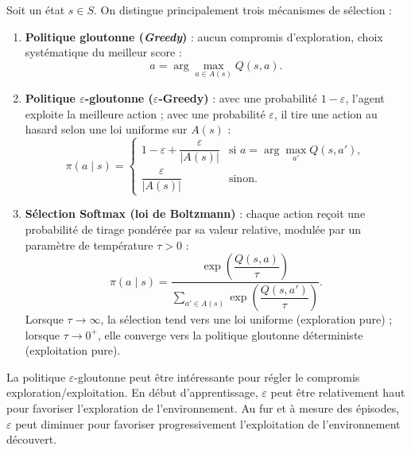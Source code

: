\begin{definition}
    Soit un état $s \in S$. On distingue principalement trois mécanismes de sélection :
    \begin{enumerate}
        \item \textbf{Politique gloutonne (\emph{Greedy})} : aucun compromis d'exploration, choix systématique du meilleur score :
        \begin{equation}
            a = \arg\max_{a \in A(s)} Q(s, a).
        \end{equation}
        \item \textbf{Politique $\varepsilon$-gloutonne ($\varepsilon$-Greedy)} : avec une probabilité $1 - \varepsilon$, l'agent exploite la meilleure action ; avec une probabilité $\varepsilon$, il tire une action au hasard selon une loi uniforme sur $A(s)$ :
        \begin{equation}
            \pi(a \mid s) = 
            \begin{cases}
                1 - \varepsilon + \dfrac{\varepsilon}{|A(s)|} & \text{si } a = \arg\max_{a'} Q(s, a'), \\[8pt]
                \dfrac{\varepsilon}{|A(s)|} & \text{sinon.}
            \end{cases}
        \end{equation}
        \item \textbf{Sélection Softmax (loi de Boltzmann)} : chaque action reçoit une probabilité de tirage pondérée par sa valeur relative, modulée par un paramètre de température $\tau > 0$ :
        \begin{equation}
            \pi(a \mid s) = \frac{\exp\left( \dfrac{Q(s, a)}{\tau} \right)}{\sum_{a' \in A(s)} \exp\left( \dfrac{Q(s, a')}{\tau} \right)}.
        \end{equation}
        Lorsque $\tau \to \infty$, la sélection tend vers une loi uniforme (exploration pure) ; lorsque $\tau \to 0^+$, elle converge vers la politique gloutonne déterministe (exploitation pure).
    \end{enumerate}
\end{definition}

\begin{remark}
    La politique $ \varepsilon$-gloutonne peut être intéressante pour régler le compromis exploration/exploitation. En début d'apprentissage, $ \varepsilon$ peut être relativement haut pour favoriser l'exploration de l'environnement. Au fur et à mesure des épisodes, $ \varepsilon$ peut diminuer pour favoriser progressivement l'exploitation de l'environnement découvert. 
\end{remark}
